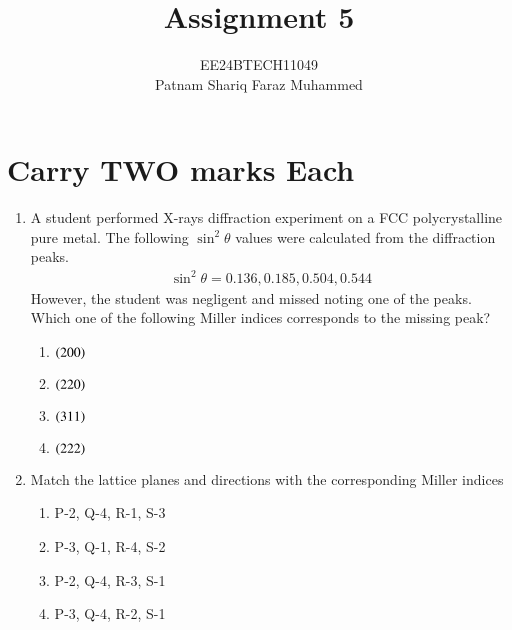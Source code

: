 \documentclass[journal]{IEEEtran}
\numberwithin{equation}{enumi}
\numberwithin{figure}{enumi}
\begin{document}


\title{Assignment 5}
\author{EE24BTECH11049 \\ Patnam Shariq Faraz Muhammed}

{\let\newpage\relax\maketitle}
\section{Carry TWO marks Each}
\begin{enumerate}
	\item A student performed X-rays diffraction experiment on a FCC polycrystalline pure metal. The following $\sin^{2}{\theta}$ values were calculated from the diffraction peaks. 
		\begin{align*}
			\sin^{2}{\theta} = 0.136, 0.185, 0.504, 0.544
		\end{align*}
	However, the student was negligent and missed noting one of the peaks. Which one of the following Miller indices corresponds to the missing peak? 
		
		\hfill{}

		\begin{multicols}{4}
			\begin{enumerate}
				\item $\left(200\right)$
				\item $\left(220\right)$
				\item $\left(311\right)$
				\item $\left(222\right)$
			\end{enumerate}
		\end{multicols}

	\item Match the lattice planes and directions  with the corresponding Miller indices 

		\begin{table}[H]
			\centering
			
		\end{table}
		\hfill{}

		\begin{enumerate}
			\item P-2, Q-4, R-1, S-3 
			\item P-3, Q-1, R-4, S-2
			\item P-2, Q-4, R-3, S-1
			\item P-3, Q-4, R-2, S-1
		\end{enumerate}


\end{enumerate}
\end{document}
